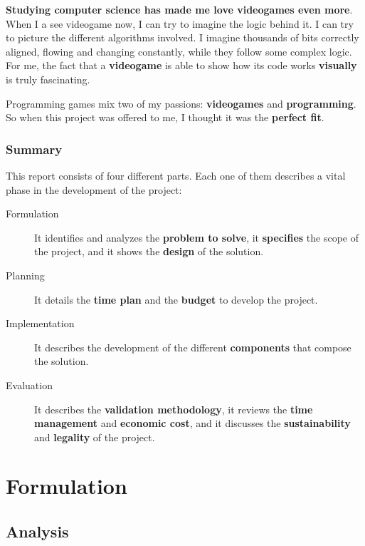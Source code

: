 \documentclass[a4paper,11pt,titlepage,abstract,numbers=noenddot,automark,mnsy,intlimits,rgb,dvipsnames]{report}
\begin{document}
\textbf{Studying computer science has made me love videogames even more}. When I a see videogame now, I can try to
imagine the logic
behind it. I can try to picture the different algorithms involved. I imagine thousands of bits correctly aligned,
flowing and changing constantly, while they follow some complex logic. For me, the fact that a \textbf{videogame} is
able to show how its code works \textbf{visually} is truly fascinating.

Programming games mix two of my passions: \textbf{videogames} and \textbf{programming}. So when this project was offered to me,
I thought it was the \textbf{perfect fit}.
\section{Summary}
This report consists of four different parts. Each one of them describes a vital phase in the development of
the project:
\begin{description}
\item[Formulation]
It identifies and analyzes the \textbf{problem to solve}, it \textbf{specifies} the scope of
  the project, and it shows the \textbf{design} of the solution.
\item[Planning]
It details the \textbf{time plan} and the \textbf{budget} to develop the project.
\item[Implementation]
It describes the development of the different \textbf{components} that compose the solution.
\item[Evaluation]
It describes the \textbf{validation methodology}, it reviews the \textbf{time management} and \textbf{economic cost},
  and it discusses the \textbf{sustainability} and \textbf{legality} of the project.
\end{description}
\part{Formulation}
\chapter{Analysis}
\end{document}
